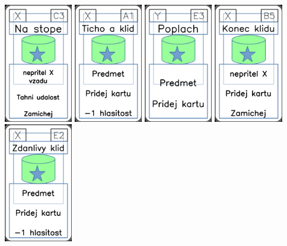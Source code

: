 \documentclass[a4paper]{article}
\begin{document}
	\includegraphics[width=3.0cm]{img-5_12}
	\includegraphics[width=3.0cm]{img-5_0}
	\includegraphics[width=3.0cm]{img-5_22}
	\includegraphics[width=3.0cm]{img-5_9}
	\includegraphics[width=3.0cm]{img-5_21}
\end{document}
